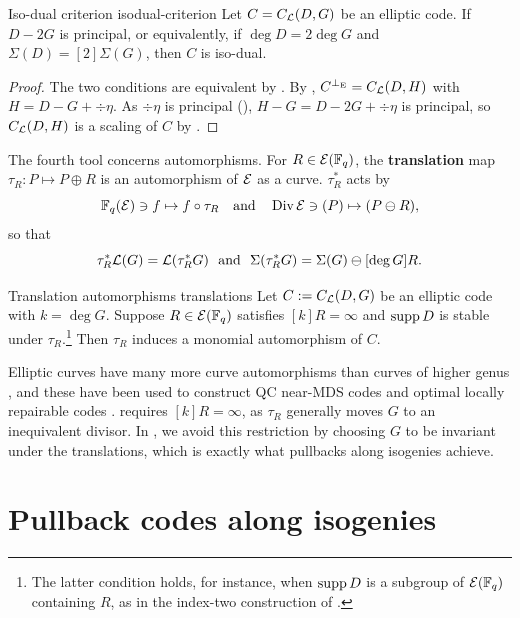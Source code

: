 \documentclass[twocolumn, 11pt]{scrartcl}
\begin{document}
\begin{lemma}{Iso-dual criterion \cite{zhu2026isodual}}{isodual-criterion}
    Let $C=C_\mathcal{L}(D,G)$ be an elliptic code. If $D-2G$ is principal, or equivalently, if $\deg D=2\deg G$ and $\Sigma(D)=[2]\Sigma(G)$, then $C$ is iso-dual.
\end{lemma}

\begin{proof}
    The two conditions are equivalent by . By , $C^{\perp_\mathrm{E}}=C_\mathcal{L}(D,H)$ with $H=D-G+\div\eta$. As $\div\eta$ is principal (), $H-G=D-2G+\div\eta$ is principal, so $C_\mathcal{L}(D,H)$ is a scaling of $C$ by .
\end{proof}

The fourth tool concerns automorphisms. For $R\in\mathcal{E}(\mathbb{F}_q)$, the \textbf{translation} map $\tau_R:P\mapsto P\oplus R$ is an automorphism of $\mathcal{E}$ as a curve. $\tau_R^*$ acts by
\[ \mathbb{F}_q(\mathcal{E})\ni f\mapsto f\circ\tau_R \quad\text{and}\quad \operatorname{Div}\mathcal{E}\ni(P)\mapsto(P\ominus R),\]
so that
\[ \tau_R^*\mcL(G)=\mcL(\tau_R^*G)\ \ \text{and}\ \ \Sigma(\tau_R^*G)=\Sigma(G)\ominus[\deg G]R.\]

\begin{theorem}{Translation automorphisms \cite{ma2023automorphism}}{translations}
    Let $C:=C_\mathcal{L}(D,G)$ be an elliptic code with $k=\deg G$. Suppose $R\in\mathcal{E}(\mathbb{F}_q)$ satisfies $[k]R=\infty$ and $\operatorname{supp} D$ is stable under $\tau_R$.\footnote{The latter condition holds, for instance, when $\operatorname{supp} D$ is a subgroup of $\mathcal{E}(\mathbb{F}_q)$ containing $R$, as in the index-two construction of \cite{wang2025nonrs}.} Then $\tau_R$ induces a monomial automorphism of $C$.
\end{theorem}

Elliptic curves have many more curve automorphisms than curves of higher genus \cite{ma2023automorphism,stichtenoth1973automorphism}, and these have been used to construct QC near-MDS codes \cite{tong2013quasicyclic} and optimal locally repairable codes \cite{ma2023automorphism}.  requires $[k]R=\infty$, as $\tau_R$ generally moves $G$ to an inequivalent divisor. In , we avoid this restriction by choosing $G$ to be invariant under the translations, which is exactly what pullbacks along isogenies achieve.

\section{Pullback codes along isogenies} \label{section:isogenies}
\end{document}
